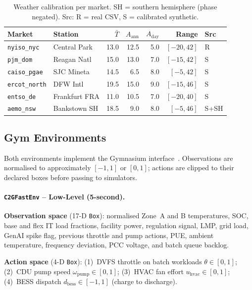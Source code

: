 \documentclass{article}
\newcommand{\envlow}{\texttt{C2GFastEnv}}
\begin{document}
\begin{table}[t]
\centering
\caption{Weather calibration per market.
SH = southern hemisphere (phase negated).
Src: R = real CSV, S = calibrated synthetic.}
\label{tab:weather}
\small
\setlength{\tabcolsep}{5pt}
\begin{tabular}{llrrrrl}
\toprule
\textbf{Market} & \textbf{Station} & $\bar{T}$ & $A_{\text{ann}}$ & $A_{\text{day}}$ & \textbf{Range} & \textbf{Src} \\
\midrule
\texttt{nyiso\_nyc}   & Central Park   & 13.0 & 12.5 & 5.0 & $[-20, 42]$ & R \\
\texttt{pjm\_dom}     & Reagan Natl    & 15.0 & 13.0 & 7.0 & $[-15, 42]$ & S \\
\texttt{caiso\_pgae}  & SJC Mineta     & 14.5 &  6.5 & 8.0 & $[-5,  42]$ & S \\
\texttt{ercot\_north} & DFW Intl       & 19.5 & 15.0 & 9.0 & $[-15, 46]$ & S \\
\texttt{entso\_de}    & Frankfurt FRA  & 11.0 & 10.5 & 7.0 & $[-20, 40]$ & S \\
\texttt{aemo\_nsw}    & Bankstown SH   & 18.5 &  9.0 & 8.0 & $[-5,  46]$ & S+SH \\
\bottomrule
\end{tabular}
\end{table}

\subsection{Gym Environments}
\label{sec:gym}

Both environments implement the Gymnasium interface~\citep{gymnasium2023}.
Observations are normalised to approximately $[-1,1]$ or $[0,1]$; actions are
clipped to their declared boxes before passing to simulators.

\paragraph{\envlow{} -- Low-Level (5-second).}

\textbf{Observation space} (17-D \texttt{Box}):
normalised Zone~A and B temperatures, SOC, base and flex IT load fractions,
facility power, regulation signal, LMP, grid load, GenAI spike flag,
previous throttle and pump actions, PUE, ambient temperature,
frequency deviation, PCC voltage, and batch queue backlog.

\textbf{Action space} (4-D \texttt{Box}):
(1)~DVFS throttle on batch workloads $\theta \in [0,1]$;
(2)~CDU pump speed $\omega_{\text{pump}} \in [0,1]$;
(3)~HVAC fan effort $u_{\text{hvac}} \in [0,1]$;
(4)~BESS dispatch $d_{\text{bess}} \in [-1,1]$ (charge to discharge).
\end{document}
